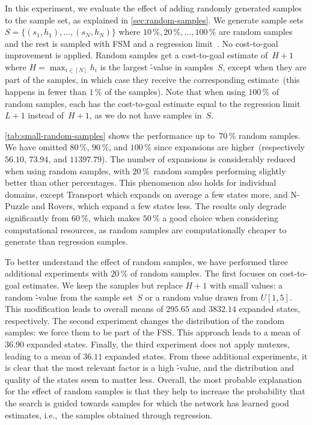 In this experiment, we evaluate the effect of adding randomly generated samples to the sample set, as explained in \cref{sec:random-samples}. We generate sample sets~$S=\{(s_1,h_1),\ldots,(s_N,h_N)\}$ where $10\,\%, 20\,\%,\ldots,100\,\%$ are random samples and the rest is sampled with FSM and a regression limit~\meanfx. No cost-to-goal improvement is applied. Random samples get a cost-to-goal estimate of~$H+1$ where $H=\max_{i\in[N]} h_i$ is the largest \h-value in samples~$S$, except when they are part of the samples, in which case they receive the corresponding estimate~(this happens in fewer than $1\,\%$ of the samples). Note that when using $100\,\%$ of random samples, each has the cost-to-goal estimate equal to the regression limit~$L+1$ instead of~$H+1$, as we do not have samples in~$S$.

\cref{tab:small-random-samples} shows the performance up to~$70\,\%$ random samples. We have omitted $80\,\%$, $90\,\%$, and $100\,\%$ since expansions are higher~(respectively $56.10$, $73.94$, and $11397.79$). The number of expansions is considerably reduced when using random samples, with $20\,\%$~random samples performing slightly better than other percentages. This phenomenon also holds for individual domains, except Transport which expands on average a few states more, and N-Puzzle and Rovers, which expand a few states less. The results only degrade significantly from $60$\,\%, which makes $50$\,\% a good choice when considering computational resources, as random samples are computationally cheaper to generate than regression samples.

To better understand the effect of random samples, we have performed three additional experiments with $20\,\%$ of random samples. The first focuses on cost-to-goal estimates. We keep the samples but replace $H+1$ with small values: a random \h-value from the sample set~$S$ or a random value drawn from $U[1,5]$. This modification leads to overall means of $295.65$ and $3832.14$ expanded states, respectively. The second experiment changes the distribution of the random samples: we force them to be part of the FSS. This approach leads to a mean of $36.90$ expanded states. Finally, the third experiment does not apply mutexes, leading to a mean of $36.11$ expanded states. From these additional experiments, it is clear that the most relevant factor is a high \h-value, and the distribution and quality of the states seem to matter less. Overall, the most probable explanation for the effect of random samples is that they help to increase the probability that the search is guided towards samples for which the network has learned good estimates, i.e.,~the samples obtained through regression.

